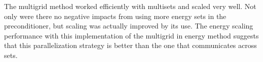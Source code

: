 



The multigrid method worked efficiently with multisets and scaled very well. %
%
Not only were there no negative impacts from using more energy sets in the preconditioner, but scaling was actually improved by its use. The energy scaling performance with this implementation of the multigrid in energy method suggests that this parallelization strategy is better than the one that communicates across sets. 

